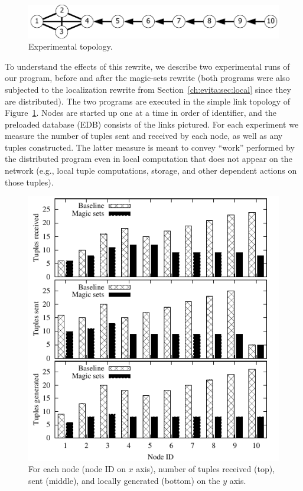 \begin{figure}
\centering
\includegraphics[scale=1.2]{figures/Topology}
\caption{Experimental topology.}
\label{ch:evita:fig:topo}
\end{figure}

To understand the effects of this rewrite, we describe two experimental
runs of our program, before and after the magic-sets rewrite (both
programs were also subjected to the localization rewrite from
Section~\ref{ch:evita:sec:local} since they are distributed).  The two
programs are executed in the simple link topology of
Figure~\ref{ch:evita:fig:topo}. Nodes are started up one at a time in order of
identifier, and the preloaded database (EDB) consists of the links pictured. For each experiment we measure the number of
tuples sent and received by each node, as well as any 
tuples constructed. The latter measure is meant to convey ``work''
performed by the distributed program even in local computation that does
not appear on the network (e.g., local tuple computations, storage, and
other dependent actions on those tuples).

\begin{figure}
\centering
\includegraphics{figures/magicNumbers}
\ssp
\caption{For each node (node ID on $x$ axis), number of tuples received
  (top), sent (middle), and locally generated (bottom) on the $y$ axis.}
\label{ch:evita:fig:magicresults}
\end{figure}

